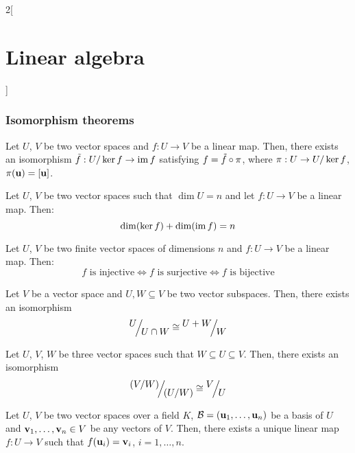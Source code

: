 \documentclass[../../../main_math.tex]{subfiles}
\begin{document}
\begin{multicols}{2}[\section{Linear algebra}]
  \subsubsection{Isomorphism theorems}
  \begin{theorem}
    Let $U$, $V$ be two vector spaces and $f:U\rightarrow V$ be a linear map. Then, there exists an isomorphism $\Tilde{f}:\quot{U}{\ker f}\rightarrow \im f$ satisfying $f=\Tilde{f}\circ\pi$, where $\pi:U\rightarrow \quot{U}{\ker f}$, $\pi(\boldsymbol{\mathrm{u}})=[\boldsymbol{\mathrm{u}}]$.
    \begin{center}
      \begin{minipage}{\linewidth}
        \centering
        
      \end{minipage}
    \end{center}
  \end{theorem}
  \begin{corollary}
    Let $U$, $V$ be two vector spaces such that $\dim U=n$ and let $f:U\rightarrow V$ be a linear map. Then: $$\dim(\ker f)+\dim(\operatorname{im} f)=n$$
  \end{corollary}
  \begin{corollary}
    Let $U$, $V$ be two finite vector spaces of dimensions $n$ and $f:U\rightarrow V$ be a linear map. Then: $$f\text{ is injective}\iff f\text{ is surjective}\iff f\text{ is bijective}$$
  \end{corollary}
  \begin{theorem}
    Let $V$ be a vector space and $U,W\subseteq V$ be two vector subspaces. Then, there exists an isomorphism $$\quot{U}{U\cap W}\cong\quot{U+W}{W}$$
  \end{theorem}
  \begin{theorem}
    Let $U$, $V$, $W$ be three vector spaces such that $W\subseteq U\subseteq V$. Then, there exists an isomorphism $$\quot{{(\textstyle\quot{V}{W})}}{{(\textstyle\quot{U}{W})}}\cong\quot{V}{U}$$
  \end{theorem}
  \begin{theorem}
    Let $U$, $V$ be two vector spaces over a field $K$, $\mathcal{B}=(\boldsymbol{\mathrm{u}}_1,\ldots,\boldsymbol{\mathrm{u}}_n)$ be a basis of $U$ and $\boldsymbol{\mathrm{v}}_1,\ldots,\boldsymbol{\mathrm{v}}_n\in V$ be any vectors of $V$. Then, there exists a unique linear map $f:U\rightarrow V$ such that $f(\boldsymbol{\mathrm{u}}_i)=\boldsymbol{\mathrm{v}}_i$, $i=1,\ldots,n$.
  \end{theorem}

\end{multicols}
\end{document}

